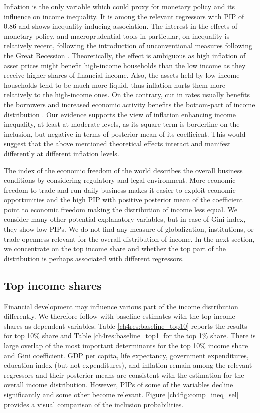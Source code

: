 \begin{refsection}
Inflation is the only variable which could proxy for monetary policy and its influence on income inequality. It is among the relevant regressors with \ac{PIP} of 0.86 and shows inequality inducing association. The interest in the effects of monetary policy, and macroprudential tools in particular, on inequality is relatively recent, following the introduction of unconventional measures following the Great Recession \parencite{frost2018macroprudential}. Theoretically, the effect is ambiguous as high inflation of asset prices might benefit high-income households than the low income as they receive higher shares of financial income. Also, the assets held by low-income households tend to be much more liquid, thus inflation hurts them more relatively to the high-income ones. On the contrary, cut in rates usually benefits the borrowers and increased economic activity benefits the bottom-part of income distribution \parencite{furceri2019robust}. Our evidence supports the view of inflation enhancing income inequality, at least at moderate levels, as its square term is borderline on the inclusion, but negative in terms of posterior mean of its coefficient. This would suggest that the above mentioned theoretical effects interact and manifest differently at different inflation levels.

The index of the economic freedom of the world describes the overall business conditions by considering regulatory and legal environment. More economic freedom to trade and run daily business makes it easier to exploit economic opportunities and the high \ac{PIP} with positive posterior mean of the coefficient point to economic freedom making the distribution of income less equal. We consider many other potential explanatory variables, but in case of Gini index, they show low \acp{PIP}. We do not find any measure of globalization, institutions, or trade openness relevant for the overall distribution of income. In the next section, we concentrate on the top income share and whether the top part of the distribution is perhaps associated with different regressors.

\subsection{Top income shares}
Financial development may influence various part of the income distribution differently. We therefore follow with baseline estimates with the top income shares as dependent variables. Table \ref{ch4res:baseline_top10} reports the results for top 10\% share and Table \ref{ch4res:baseline_top1} for the top 1\% share. There is large overlap of the most important determinants for the top 10\% income share and Gini coefficient. GDP per capita, life expectancy, government expenditures, education index (but not expenditures), and inflation remain among the relevant regressors and their posterior means are consistent with the estimation for the overall income distribution. However, \acp{PIP} of some of the variables decline significantly and some other become relevant. Figure \ref{ch4fig:comp_ineq_sel} provides a visual comparison of the inclusion probabilities.


\end{refsection}
